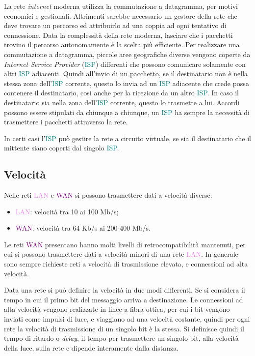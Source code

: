 \documentclass{article}
\numberwithin{equation}{subsection}
\begin{document}
La rete \textit{internet} moderna utilizza la commutazione a datagramma, per motivi economici e gestionali. Altrimenti sarebbe necessario un gestore della rete che deve trovare 
un percorso ed attribuirlo ad una coppia ad ogni tentativo di connessione. Data la complessità della rete moderna, lasciare che i pacchetti trovino il percorso 
autonomamente è la scelta più efficiente. 
Per realizzare una commutazione a datagramma, piccole aree geografiche diverse vengono coperte da \textit{Internet Service Provider} (\textcolor{teal}{ISP}) differenti che possono comunicare 
solamente con altri \textcolor{teal}{ISP} adiacenti. Quindi all'invio di un pacchetto, se il destinatario non è nella stessa zona dell'\textcolor{teal}{ISP} corrente, questo lo invia ad un \textcolor{teal}{ISP} adiacente 
che crede possa contenere il destinatario, così anche per la ricezione da un altro \textcolor{teal}{ISP}. In caso il destinatario sia nella zona dell'\textcolor{teal}{ISP} corrente, questo lo trasmette a lui. 
Accordi possono essere stipulati da chiunque a chiunque, un \textcolor{teal}{ISP} ha sempre la necessità di trasmettere i pacchetti attraverso la rete. 

In certi casi l'\textcolor{teal}{ISP} può gestire la rete a circuito virtuale, se sia il destinatario che il mittente siano coperti dal singolo \textcolor{teal}{ISP}. 

\subsection{Velocità}

Nelle reti \textcolor{violet}{LAN} e \textcolor{purple}{WAN}  si possono trasmettere dati a velocità diverse:

\begin{itemize}
    \item \textcolor{violet}{LAN}: velocità tra 10 ai 100 Mb/s;
    \item \textcolor{purple}{WAN}: velocità tra 64 Kb/s ai 200-400 Mb/s. 
\end{itemize} 

Le reti \textcolor{purple}{WAN} presentano hanno molti livelli di retrocompatibilità mantenuti, per cui si possono trasmettere dati a velocità minori di una rete \textcolor{violet}{LAN}. 
In generale sono sempre richieste reti a velocità di trasmissione elevata, e connessioni ad alta velocità. 

Data una rete si può definire la velocità in due modi differenti. Se si considera il tempo in cui il primo bit del messaggio arriva a destinazione. Le connessioni ad 
alta velocità vengono realizzate in linee a fibra ottica, per cui i bit vengono inviati come impulsi di luce, e viaggiano ad una velocità costante, quindi per ogni rete 
la velocità di trasmissione di un singolo bit è la stessa. Si definisce quindi il tempo di ritardo o \textit{delay}, il tempo per trasmettere un singolo bit, alla velocità della luce, sulla 
rete e dipende interamente dalla distanza. 
\end{document}
